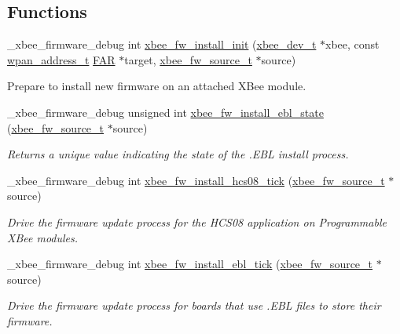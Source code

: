 \subsection*{Functions}
\begin{DoxyCompactItemize}
\item 
\-\_\-xbee\-\_\-firmware\-\_\-debug int \hyperlink{group__xbee__firmware_ga3ea95570f7d7366e42b0ee6ba21a1c41}{xbee\-\_\-fw\-\_\-install\-\_\-init} (\hyperlink{structxbee__dev__t}{xbee\-\_\-dev\-\_\-t} $\ast$xbee, const \hyperlink{structwpan__address__t}{wpan\-\_\-address\-\_\-t} \hyperlink{group__hal_gaef060b3456fdcc093a7210a762d5f2ed}{F\-A\-R} $\ast$target, \hyperlink{structxbee__fw__source__t}{xbee\-\_\-fw\-\_\-source\-\_\-t} $\ast$source)
\begin{DoxyCompactList}\small\item\em \begin{DoxyVerb}        Prepare to install new firmware on an attached XBee module.\end{DoxyVerb}
 \end{DoxyCompactList}\item 
\-\_\-xbee\-\_\-firmware\-\_\-debug unsigned int \hyperlink{group__xbee__firmware_ga8590708a38ac57ace8c816cc7cfd0859}{xbee\-\_\-fw\-\_\-install\-\_\-ebl\-\_\-state} (\hyperlink{structxbee__fw__source__t}{xbee\-\_\-fw\-\_\-source\-\_\-t} $\ast$source)
\begin{DoxyCompactList}\small\item\em Returns a unique value indicating the state of the .E\-B\-L install process. \end{DoxyCompactList}\item 
\-\_\-xbee\-\_\-firmware\-\_\-debug int \hyperlink{group__xbee__firmware_ga00113850eb74d0cb2928c9530d253381}{xbee\-\_\-fw\-\_\-install\-\_\-hcs08\-\_\-tick} (\hyperlink{structxbee__fw__source__t}{xbee\-\_\-fw\-\_\-source\-\_\-t} $\ast$source)
\begin{DoxyCompactList}\small\item\em Drive the firmware update process for the H\-C\-S08 application on Programmable X\-Bee modules. \end{DoxyCompactList}\item 
\-\_\-xbee\-\_\-firmware\-\_\-debug int \hyperlink{group__xbee__firmware_gaae62252a2e1331127c9df86b6ebfc4e8}{xbee\-\_\-fw\-\_\-install\-\_\-ebl\-\_\-tick} (\hyperlink{structxbee__fw__source__t}{xbee\-\_\-fw\-\_\-source\-\_\-t} $\ast$source)
\begin{DoxyCompactList}\small\item\em Drive the firmware update process for boards that use .E\-B\-L files to store their firmware. \end{DoxyCompactList}\item 

\end{DoxyCompactItemize}
